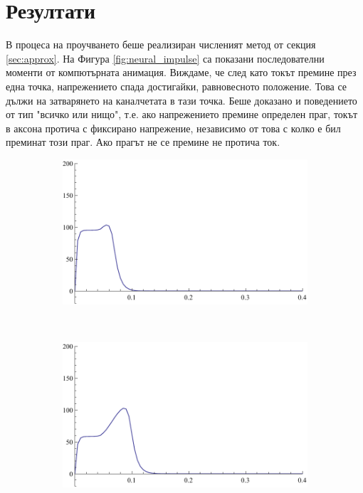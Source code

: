 \documentclass{article}
\numberwithin{equation}{section}
\begin{document}
    \section{Резултати}
        
    В процеса на проучването беше реализиран численият метод от секция \ref{sec:approx}. На Фигура \ref{fig:neural_impulse} са показани
    последователни моменти от компютърната анимация. Виждаме, че след като токът премине през една точка, напрежението спада достигайки,
    равновесното положение. Това се дължи на затварянето на каналчетата в тази точка. Беше доказано и поведението от тип "всичко или нищо", 
    т.е. ако напрежението премине определен праг, токът в аксона протича с фиксирано напрежение, независимо от това с колко е бил преминат този
    праг. Ако прагът не се премине не протича ток.
    \begin{figure}[H]
        \centering
        \begin{subfigure}[t]{0.3\textwidth}
            \includegraphics[width=\textwidth]{./schemas/Neuron1.pdf}
        \end{subfigure}
        ~ %
        \begin{subfigure}[t]{0.3\textwidth}
            \includegraphics[width=\textwidth]{./schemas/Neuron2.pdf}

\end{subfigure}
\end{figure}
\end{document}
